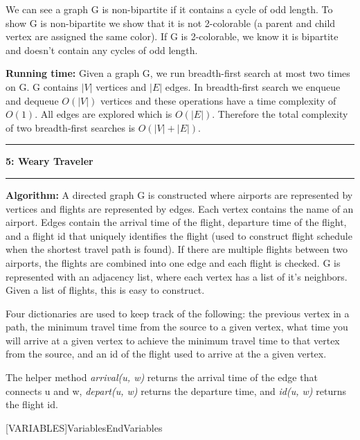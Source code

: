 \documentclass[11pt]{article}
\newcommand\question[2]{\vspace{.25in}\hrule\textbf{#1: #2}\vspace{.5em}\hrule\vspace{.10in}}
\newcommand\algorith{\vspace{.10in}\textbf{Algorithm: }}
\newcommand\runtime{\vspace{.10in}\textbf{Running time: }}
\begin{document}


We can see a graph G is non-bipartite if it contains a cycle of odd length. To show G is non-bipartite we show that it is not 2-colorable (a parent and child vertex are assigned the same color). If G is 2-colorable, we know it is bipartite and doesn't contain any cycles of odd length.

\runtime Given a graph G, we run breadth-first search at most two times on G. G contains $|V|$ vertices and $|E|$ edges. In breadth-first search we enqueue and dequeue $O(|V|)$ vertices and these operations have a time complexity of $O(1)$. All edges are explored which is $O(|E|)$. Therefore the total complexity of two breadth-first searches is $O(|V| + |E|)$.


\question{5}{Weary Traveler}

\algorith A directed graph G is constructed where airports are represented by vertices and flights are represented by edges. Each vertex contains the name of an airport. Edges contain the arrival time of the flight, departure time of the flight, and a flight id that uniquely identifies the flight (used to construct flight schedule when the shortest travel path is found). If there are multiple flights between two airports, the flights are combined into one edge and each flight is checked. G is represented with an adjacency list, where each vertex has a list of it's neighbors. Given a list of flights, this is easy to construct.

	Four dictionaries are used to keep track of the following: the previous vertex in a path, the minimum travel time from the source to a given vertex, what time you will arrive at a given vertex to achieve the minimum travel time to that vertex from the source, and an id of the flight used to arrive at the a given vertex.
	
	The helper method \textit{arrival(u, w)} returns the arrival time of the edge that connects u and w, \textit{depart(u, w)} returns the departure time, and \textit{id(u, w)} returns the flight id.
	
	[VARIABLES]{Variables}{EndVariables}
   {\algorithmicvariables}
   {\algorithmicend\ \algorithmicvariables}
\end{document}
